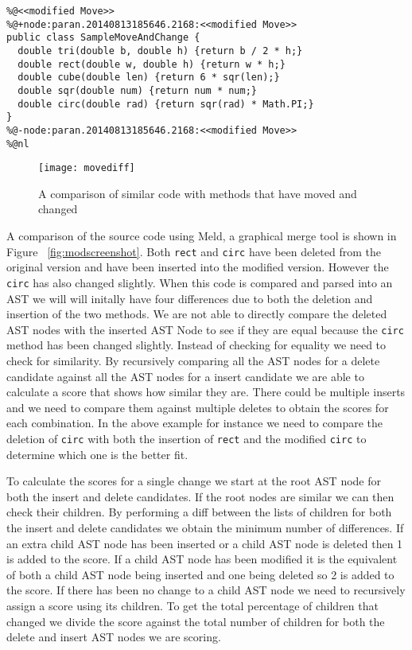 \begin{lstlisting}
%@<<modified Move>>
%@+node:paran.20140813185646.2168:<<modified Move>>
public class SampleMoveAndChange {
  double tri(double b, double h) {return b / 2 * h;}
  double rect(double w, double h) {return w * h;}
  double cube(double len) {return 6 * sqr(len);}
  double sqr(double num) {return num * num;}
  double circ(double rad) {return sqr(rad) * Math.PI;}
}
%@-node:paran.20140813185646.2168:<<modified Move>>
%@nl
\end{lstlisting}


\begin{figure}[!t]
\begin{center}
 \texttt{[image: movediff]}
 \end{center}
\caption{A comparison of similar code with methods that have moved and changed}
 \label{fig:orig}
\end{figure}


A comparison of the source code using Meld, a graphical merge tool is shown in Figure ~\ref{fig:modscreenshot}. Both \lstinline{rect} and \lstinline{circ} have been deleted from the original version and have been inserted into the modified version.  However the \lstinline{circ} has also changed slightly. 
When this code is compared and parsed into an AST we will will initally have four differences due to both the deletion and insertion of the two methods.    
We are not able to directly compare the deleted AST nodes with the inserted AST Node to see if they are equal because the \lstinline{circ} method has been changed slightly. 
Instead of checking for equality we need to check for similarity.
By recursively comparing all the AST nodes for a delete candidate against all the AST nodes for a insert candidate we are able to calculate a score that shows how similar they are. 
There could be multiple inserts and we need to compare them against multiple deletes to obtain the scores for each combination.
In the above example for instance we need to compare the deletion of \lstinline{circ} with both the insertion of \lstinline{rect} and the modified \lstinline{circ} to determine which one is the better fit.

To calculate the scores for a single change we start at the root AST node for both the insert and delete candidates.  If the root nodes are similar we can then check their children. By performing a diff between the lists of children for both the insert and delete candidates we obtain the minimum number of differences.  If an extra child AST node has been inserted or a child AST node is deleted then 1 is added to the score. If a child AST node has been modified it is the equivalent of both a child AST node being inserted and one being deleted so 2 is added to the score. If there has been no change to a child AST node we need to recursively assign a score using its children. To get the total percentage of children that changed we divide the score against the total number of children for both the delete and insert AST nodes we are scoring.

